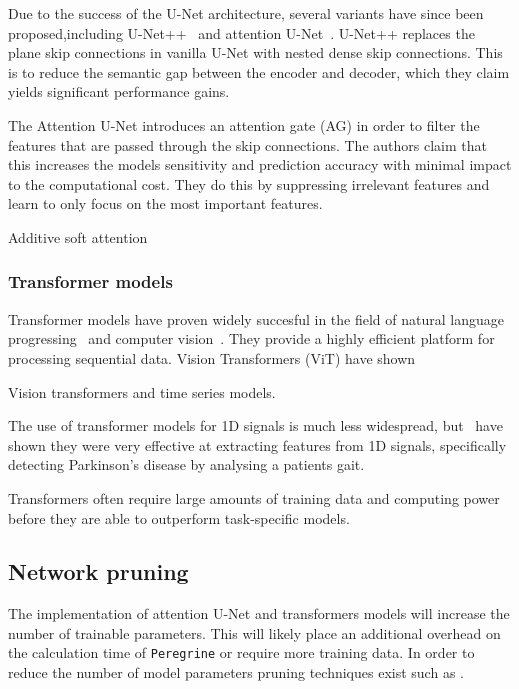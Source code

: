 Due to the success of the U-Net architecture, several variants have since been proposed,including U-Net++~\cite{Zhou_2018_unet++} and attention U-Net~\cite{Oktay_2018_AUNet}. U-Net++
replaces the plane skip connections in vanilla U-Net with nested dense skip connections. This is to reduce the semantic gap between the encoder and decoder, which they claim yields significant performance gains.

The Attention U-Net introduces an attention gate (AG) in order to filter the features that are passed through the skip connections. The authors claim that this increases the models sensitivity and prediction accuracy with minimal impact to the computational cost. They do this by suppressing irrelevant features and learn to only focus on the most important features. 

Additive soft attention

\subsubsection{Transformer models}

Transformer models have proven widely succesful in the field of natural language progressing~\cite{Vaswani_2017_transformer} and computer vision~\cite{Dosovitskiy_2021_vit}. They provide a highly efficient platform for processing sequential data. Vision Transformers (ViT) have shown 

Vision transformers and time series models.

The use of transformer models for 1D signals is much less widespread, but~\cite{Nguyen_Miah_Bilodeau_Bouachir_2022} have shown they were very effective at extracting features from 1D signals, specifically detecting Parkinson's disease by analysing a patients gait. 

Transformers often require large amounts of training data and computing power before they are able to outperform task-specific models.

\subsection{Network pruning}

The implementation of attention U-Net and transformers models will increase the number of trainable parameters. This will likely place an additional overhead on the calculation time of \texttt{Peregrine} or require more training data. In order to reduce the number of model parameters pruning techniques exist such as \cite{Fang_Ma_Song_Mi_Wang_2023}.

